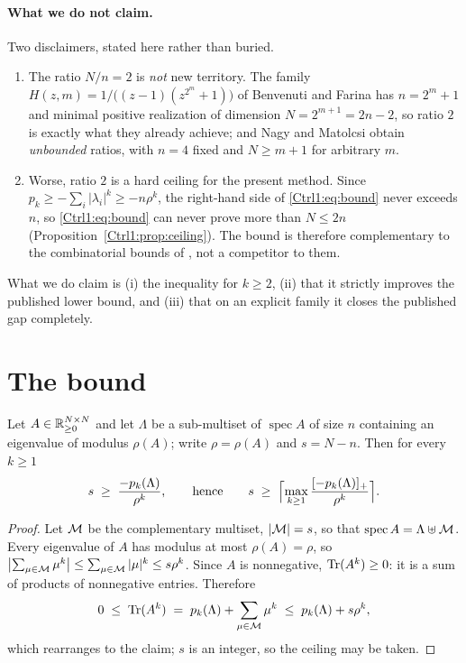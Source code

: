 \paragraph{What we do not claim.} Two disclaimers, stated here rather than buried.
\begin{enumerate}
\item[(a)] The ratio $N/n=2$ is \emph{not} new territory. The family
$H(z,m)=1/\bigl((z-1)(z^{2^{m}}+1)\bigr)$ of Benvenuti and Farina \cite{BF99} has
$n=2^{m}+1$ and minimal positive realization of dimension $N=2^{m+1}=2n-2$, so ratio $2$ is
exactly what they already achieve; and Nagy and Matolcsi \cite{NM03} obtain \emph{unbounded}
ratios, with $n=4$ fixed and $N\ge m+1$ for arbitrary $m$.
\item[(b)] Worse, ratio $2$ is a hard ceiling for the present method.
Since $p_k\ge-\sum_i|\lambda_i|^{k}\ge-n\rho^{k}$, the right-hand side of \eqref{Ctrl1:eq:bound}
never exceeds $n$, so \eqref{Ctrl1:eq:bound} can never prove more than $N\le 2n$
(Proposition~\ref{Ctrl1:prop:ceiling}). The bound is therefore complementary to the combinatorial
bounds of \cite{NM03}, not a competitor to them.
\end{enumerate}
What we do claim is (i) the inequality for $k\ge2$, (ii) that it strictly improves the
published lower bound, and (iii) that on an explicit family it closes the published gap
completely.

\section{The bound}\label{Ctrl1:sec:bound}

\begin{theorem}\label{Ctrl1:thm:main}
Let $A\in\mathbb{R}_{\ge0}^{N\times N}$ and let $\Lambda$ be a sub-multiset of $\operatorname{spec}A$
of size $n$ containing an eigenvalue of modulus $\rho(A)$; write $\rho=\rho(A)$ and
$s=N-n$. Then for every $k\ge1$
\[
s\;\ge\;\frac{-p_k(\Lambda)}{\rho^{k}},
\qquad\text{hence}\qquad
s\;\ge\;\Bigl\lceil\max_{k\ge1}\frac{[-p_k(\Lambda)]_+}{\rho^{k}}\Bigr\rceil .
\]
\end{theorem}

\begin{proof}
Let $\mathcal{M}$ be the complementary multiset, $|\mathcal{M}|=s$, so that
$\operatorname{spec}A=\Lambda\uplus\mathcal{M}$. Every eigenvalue of $A$ has modulus at most
$\rho(A)=\rho$, so $\bigl|\sum_{\mu\in\mathcal{M}}\mu^{k}\bigr|\le\sum_{\mu\in\mathcal{M}}|\mu|^{k}\le
s\rho^{k}$. Since $A$ is nonnegative, $\operatorname{Tr}(A^{k})\ge0$: it is a sum of products of
nonnegative entries. Therefore
\[
0\;\le\;\operatorname{Tr}(A^{k})\;=\;p_k(\Lambda)+\sum_{\mu\in\mathcal{M}}\mu^{k}\;\le\;p_k(\Lambda)+s\rho^{k},
\]
which rearranges to the claim; $s$ is an integer, so the ceiling may be taken.
\end{proof}

